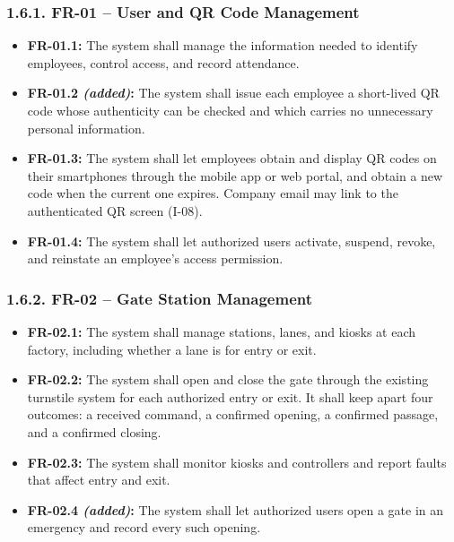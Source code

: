 \subsubsection*{1.6.1. FR-01 -- User and QR Code Management}

{}

\begin{itemize}[leftmargin=36pt, itemsep=2pt, topsep=4pt, parsep=2pt]
  \item \textbf{FR-01.1:} The system shall manage the information needed to identify employees, control access, and record attendance.
  \item \textbf{FR-01.2 \textit{(added)}:} The system shall issue each employee a short-lived QR code whose authenticity can be checked and which carries no unnecessary personal information.
  \item \textbf{FR-01.3:} The system shall let employees obtain and display QR codes on their smartphones through the mobile app or web portal, and obtain a new code when the current one expires. Company email may link to the authenticated QR screen (I-08).
  \item \textbf{FR-01.4:} The system shall let authorized users activate, suspend, revoke, and reinstate an employee's access permission.
\end{itemize}

\subsubsection*{1.6.2. FR-02 -- Gate Station Management}

{}

\begin{itemize}[leftmargin=36pt, itemsep=2pt, topsep=4pt, parsep=2pt]
  \item \textbf{FR-02.1:} The system shall manage stations, lanes, and kiosks at each factory, including whether a lane is for entry or exit.
  \item \textbf{FR-02.2:} The system shall open and close the gate through the existing turnstile system for each authorized entry or exit. It shall keep apart four outcomes: a received command, a confirmed opening, a confirmed passage, and a confirmed closing.
  \item \textbf{FR-02.3:} The system shall monitor kiosks and controllers and report faults that affect entry and exit.
  \item \textbf{FR-02.4 \textit{(added)}:} The system shall let authorized users open a gate in an emergency and record every such opening.
\end{itemize}

